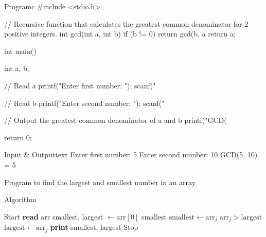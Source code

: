 \documentclass[11pt]{ipu-c}
\begin{document}
    \newpage
    \begin{code}
        {Program}{c}
#include <stdio.h>

// Recursive function that calculates the greatest common denominator for 2 positive integers.
int gcd(int a, int b) {
    if (b != 0) {
        return gcd(b, a %
    }
    return a;
}

int main() {
    int a, b;

    // Read a
    printf("Enter first number: ");
    scanf("%

    // Read b
    printf("Enter second number: ");
    scanf("%

    // Output the greatest common denominator of a and b
    printf("GCD(%

    return 0;
}
    \end{code}
    \begin{code}
        {Input \& Output}{text}
Enter first number: 5
Enter second number: 10
GCD(5, 10) = 5
    \end{code}


    {Program to find the largest and smallest number in an array}

    \begin{tabularsection}{Algorithm}
        \begin{algorithmic}[1]
            \State Start
            \State \textbf{read} arr
            \State smallest, largest $\gets \text{arr}[0]$
            \State smallest
                    \State $\text{smallest} \gets \text{arr}_j$
                \ElsIf
                        {$\text{arr}_j > \text{largest}$}
                    \State $\text{largest} \gets \text{arr}_j$
                \EndIf
            \EndFor
            \State \textbf{print} smallest, largest
            \State Stop
        \end{algorithmic}
    \end{tabularsection}
\end{document}
